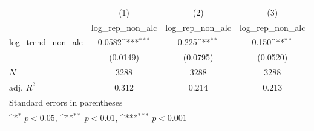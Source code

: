 {
\def\sym#1{\ifmmode^{#1}\else\(^{#1}\)\fi}
\begin{tabular}{l*{3}{c}}
\hline\hline
            &\multicolumn{1}{c}{(1)}&\multicolumn{1}{c}{(2)}&\multicolumn{1}{c}{(3)}\\
            &\multicolumn{1}{c}{log\_rep\_non\_alc}&\multicolumn{1}{c}{log\_rep\_non\_alc}&\multicolumn{1}{c}{log\_rep\_non\_alc}\\
\hline
log\_trend\_non\_alc&      0.0582\sym{***}&       0.225\sym{**} &       0.150\sym{**} \\
            &    (0.0149)         &    (0.0795)         &    (0.0520)         \\
\hline
\(N\)       &        3288         &        3288         &        3288         \\
adj. \(R^{2}\)&       0.312         &       0.214         &       0.213         \\
\hline\hline
\multicolumn{4}{l}{\footnotesize Standard errors in parentheses}\\
\multicolumn{4}{l}{\footnotesize \sym{*} \(p<0.05\), \sym{**} \(p<0.01\), \sym{***} \(p<0.001\)}\\
\end{tabular}
}
